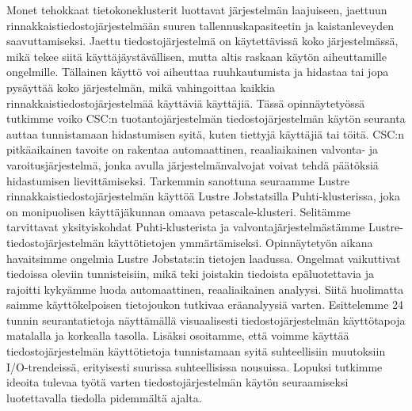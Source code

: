 \makecoverpage
\makecopyrightpage

\begin{abstractpage}[english]
\abstracttext
\end{abstractpage}



\begin{abstractpage}[finnish]
Monet tehokkaat tietokoneklusterit luottavat järjestelmän laajuiseen, jaettuun rinnakkaistiedostojärjestelmään suuren tallennuskapasiteetin ja kaistanleveyden saavuttamiseksi.
Jaettu tiedostojärjestelmä on käytettävissä koko järjestelmässä, mikä tekee siitä käyttäjäystävällisen, mutta altis raskaan käytön aiheuttamille ongelmille.
Tällainen käyttö voi aiheuttaa ruuhkautumista ja hidastaa tai jopa pysäyttää koko järjestelmän, mikä vahingoittaa kaikkia rinnakkaistiedostojärjestelmää käyttäviä käyttäjiä.
Tässä opinnäytetyössä tutkimme voiko CSC:n tuotantojärjestelmän tiedostojärjestelmän käytön seuranta auttaa tunnistamaan hidastumisen syitä, kuten tiettyjä käyttäjiä tai töitä.
CSC:n pitkäaikainen tavoite on rakentaa automaattinen, reaaliaikainen valvonta- ja varoitusjärjestelmä, jonka avulla järjestelmänvalvojat voivat tehdä päätöksiä hidastumisen lievittämiseksi.
Tarkemmin sanottuna seuraamme Lustre rinnakkaistiedostojärjestelmän käyttöä Lustre Jobstatsilla Puhti-klusterissa, joka on monipuolisen käyttäjäkunnan omaava petascale-klusteri.
Selitämme tarvittavat yksityiskohdat Puhti-klusterista ja valvontajärjestelmästämme Lustre-tiedostojärjestelmän käyttötietojen ymmärtämiseksi.
Opinnäytetyön aikana havaitsimme ongelmia Lustre Jobstats:in tietojen laadussa.
Ongelmat vaikuttivat tiedoissa oleviin tunnisteisiin, mikä teki joistakin tiedoista epäluotettavia ja rajoitti kykyämme luoda automaattinen, reaaliaikainen analyysi.
Siitä huolimatta saimme käyttökelpoisen tietojoukon tutkivaa eräanalyysiä varten.
Esittelemme 24 tunnin seurantatietoja näyttämällä visuaalisesti tiedostojärjestelmän käyttötapoja matalalla ja korkealla tasolla.
Lisäksi osoitamme, että voimme käyttää tiedostojärjestelmän käyttötietoja tunnistamaan syitä suhteellisiin muutoksiin I/O-trendeissä, erityisesti suurissa suhteellisissa nousuissa.
Lopuksi tutkimme ideoita tulevaa työtä varten tiedostojärjestelmän käytön seuraamiseksi luotettavalla tiedolla pidemmältä ajalta.
\end{abstractpage}


